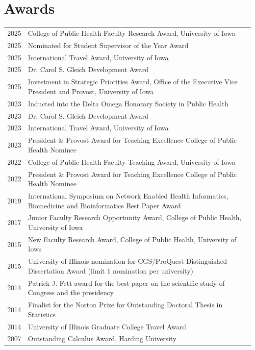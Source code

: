 \documentclass[11pt]{article}
\begin{document}
\vspace{0.5pc}

\section{Awards}
\begin{tabular}{r|p{16cm}}
2025 & College of Public Health Faculty Research Award, University of Iowa \\
2025 & Nominated for Student Supervisor of the Year Award \\
2025 & International Travel Award, University of Iowa \\
2025 & Dr. Carol S. Gleich Development Award \\
2025 & Investment in Strategic Priorities Award, Office of the Executive Vice President and Provost, University of Iowa \\
2023 & Inducted into the Delta Omega Honorary Society in Public Health \\
2023 & Dr. Carol S. Gleich Development Award \\
2023 & International Travel Award, University of Iowa \\
2023 & President \& Provost Award for Teaching Excellence College of Public Health Nominee \\
2022 & College of Public Health Faculty Teaching Award, University of Iowa \\%
2022 & President \& Provost Award for Teaching Excellence College of Public Health Nominee \\
2019 & International Symposium on Network Enabled Health Informatics, Biomedicine and Bioinformatics Best Paper Award \\%
2017 & Junior Faculty Research Opportunity Award, College of Public Health, University of Iowa \\
2015 & New Faculty Research Award, College of Public Health, University of Iowa \\
2015 & University of Illinois nomination for CGS/ProQuest Distinguished Dissertation Award (limit 1 nomination per university) \\
2014 & Patrick J. Fett award for the best paper on the scientific study of Congress and the presidency \\
2014 & Finalist for the Norton Prize for Outstanding Doctoral Thesis in Statistics \\
2014 & University of Illinois Graduate College Travel Award \\
2007 & Outstanding Calculus Award, Harding University 
\end{tabular}
\end{document}
